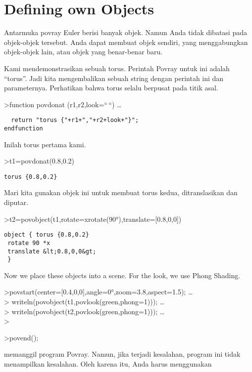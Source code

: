 \documentclass[
]{book}
\begin{document}
\chapter{Defining own Objects}\label{defining-own-objects}

Antarmuka povray Euler berisi banyak objek. Namun Anda tidak dibatasi pada objek-objek tersebut. Anda dapat membuat objek sendiri, yang menggabungkan objek-objek lain, atau objek yang benar-benar baru.

Kami mendemonstrasikan sebuah torus. Perintah Povray untuk ini adalah ``torus''. Jadi kita mengembalikan sebuah string dengan perintah ini dan parameternya. Perhatikan bahwa torus selalu berpusat pada titik asal.

\textgreater function povdonat (r1,r2,look=``\,``) \ldots{}

\begin{verbatim}
  return "torus {"+r1+","+r2+look+"}";
endfunction
\end{verbatim}

Inilah torus pertama kami.

\textgreater t1=povdonat(0.8,0.2)

\begin{verbatim}
torus {0.8,0.2}
\end{verbatim}

Mari kita gunakan objek ini untuk membuat torus kedua, ditranslasikan dan diputar.

\textgreater t2=povobject(t1,rotate=xrotate(90°),translate={[}0.8,0,0{]})

\begin{verbatim}
object { torus {0.8,0.2}
 rotate 90 *x 
 translate &lt;0.8,0,0&gt;
 }
\end{verbatim}

Now we place these objects into a scene. For the look, we use Phong Shading.

\textgreater povstart(center={[}0.4,0,0{]},angle=0°,zoom=3.8,aspect=1.5); \ldots{}\\
\textgreater{} writeln(povobject(t1,povlook(green,phong=1))); \ldots{}\\
\textgreater{} writeln(povobject(t2,povlook(green,phong=1))); \ldots{}\\
\textgreater{}

\textgreater povend();

memanggil program Povray. Namun, jika terjadi kesalahan, program ini tidak menampilkan kesalahan. Oleh karena itu, Anda harus menggunakan
\end{document}
